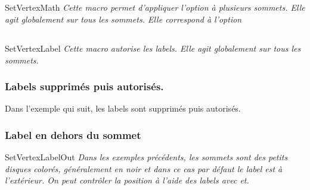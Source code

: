 \subsection{ } 
\begin{NewMacroBox}{SetVertexMath}{}
\emph{Cette macro permet d'appliquer l'option  à plusieurs  sommets. Elle agit globalement sur tous les sommets. Elle correspond à l'option  }
\end{NewMacroBox}

\begin{tkzexample}[latex=7cm,small]
\end{tkzexample} 

\subsection{}  
\begin{NewMacroBox}{SetVertexLabel}{}
\emph{ Cette macro autorise les labels. Elle agit globalement sur tous les sommets.}
\end{NewMacroBox} 

\subsubsection{Labels  supprimés puis autorisés.} 
 Dans l'exemple qui suit, les labels sont supprimés puis autorisés.
 
\begin{tkzexample}[latex=7cm,small]
\end{tkzexample}

\subsubsection{Label en dehors du sommet }

\begin{NewMacroBox}{SetVertexLabelOut}{}
\emph{ Dans les exemples précédents, les sommets sont des petits disques colorés, généralement en noir et dans ce cas par défaut le label est à l'extérieur.  On peut contrôler la position à l'aide des labels avec    et.}
\end{NewMacroBox}

